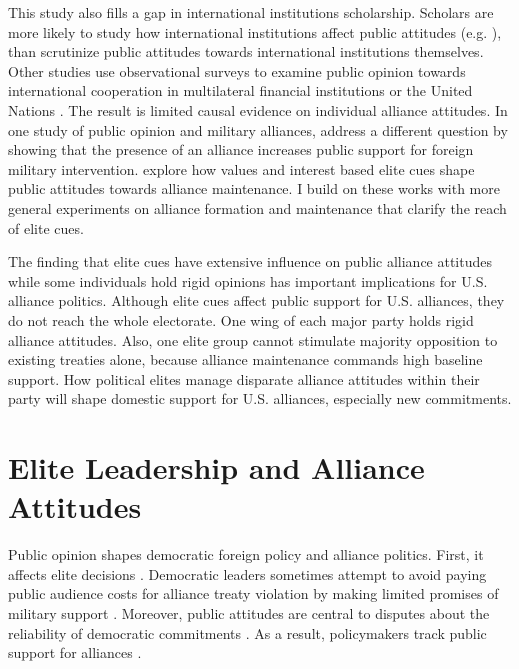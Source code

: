 \documentclass[12pt]{article}
\begin{document}
This study also fills a gap in international institutions scholarship. 
Scholars are more likely to study how international institutions affect public attitudes (e.g. \cite{Griecoetal2011, KayaWalker2014, Greenhill2020, RecchiaChu2021}), than scrutinize public attitudes towards international institutions themselves. 
Other studies use observational surveys to examine public opinion towards international cooperation in multilateral financial institutions \citep{Edwards2009} or the United Nations \citep{Torgler2008, DellmuthTallberg2015}. 
The result is limited causal evidence on individual alliance attitudes.
In one study of public opinion and military alliances, \citet{TomzWeeks2021} address a different question by showing that the presence of an alliance increases public support for foreign military intervention. 
\citet{Chuetal2021} explore how values and interest based elite cues shape public attitudes towards alliance maintenance. 
I build on these works with more general experiments on alliance formation and maintenance that clarify the reach of elite cues.


The finding that elite cues have extensive influence on public alliance attitudes while some individuals hold rigid opinions has important implications for U.S. alliance politics. 
Although elite cues affect public support for U.S. alliances, they do not reach the whole electorate.
One wing of each major party holds rigid alliance attitudes.
Also, one elite group cannot stimulate majority opposition to existing treaties alone, because alliance maintenance commands high baseline support. 
How political elites manage disparate alliance attitudes within their party will shape domestic support for U.S. alliances, especially new commitments.



\section{Elite Leadership and Alliance Attitudes}


Public opinion shapes democratic foreign policy and alliance politics.
First, it affects elite decisions \citep{Tomzetal2020, LinGreenberg2021, ChuRechhia2021}. 
Democratic leaders sometimes attempt to avoid paying public audience costs for alliance treaty violation by making limited promises of military support \citep{Chibaetal2015, FjelstulReiter2019}. 
Moreover, public attitudes are central to disputes about the reliability of democratic commitments \citep{Gaubatz1996, GartzkeGleditsch2004}. 
As a result, policymakers track public support for alliances \citep{Sayle2019}. 
\end{document}
